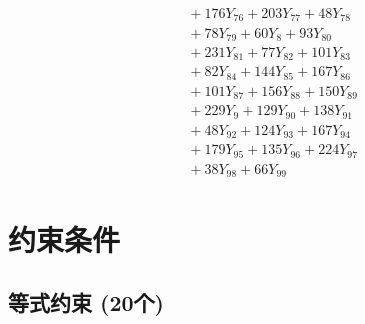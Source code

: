 \documentclass[a4paper,10pt]{article}
\begin{document}
{\begin{align}
&\quad  + 176Y_{76} + 203Y_{77} + 48Y_{78} \\[0.5ex]
&\quad  + 78Y_{79} + 60Y_{8} + 93Y_{80} \\[0.5ex]
&\quad  + 231Y_{81} + 77Y_{82} + 101Y_{83} \\[0.5ex]
&\quad  + 82Y_{84} + 144Y_{85} + 167Y_{86} \\[0.5ex]
&\quad  + 101Y_{87} + 156Y_{88} + 150Y_{89} \\[0.5ex]
&\quad  + 229Y_{9} + 129Y_{90} + 138Y_{91} \\[0.5ex]
&\quad  + 48Y_{92} + 124Y_{93} + 167Y_{94} \\[0.5ex]
&\quad  + 179Y_{95} + 135Y_{96} + 224Y_{97} \\[0.5ex]
&\quad  + 38Y_{98} + 66Y_{99}\nonumber
\end{align}
}

\section{约束条件}

\subsection{等式约束 (20个)}
\end{document}
